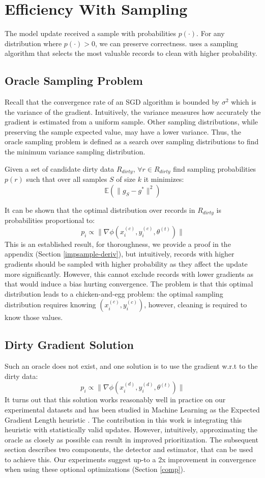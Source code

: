 \section{Efficiency With Sampling}\label{dist-samp}
The model update received a sample with probabilities $p(\cdot)$.
For any distribution where  $p(\cdot) > 0$, we can preserve correctness.
\sys uses a sampling algorithm that selects the most valuable records to clean with higher probability. 

\subsection{Oracle Sampling Problem}
Recall that the convergence rate of an SGD algorithm is bounded by $\sigma^2$ which is the variance of the gradient.
Intuitively, the variance measures how accurately the gradient is estimated from a uniform sample.
Other sampling distributions, while preserving the sample expected value, may have a lower variance.
Thus, the oracle sampling problem is defined as a search over sampling distributions to find the minimum variance sampling distribution.

\begin{definition}
Given a set of candidate dirty data $R_{dirty}$, $\forall r \in R_{dirty}$ find sampling probabilities $p(r)$ such that over all samples $S$ of size $k$ it minimizes:
\[
\mathbb{E}(\|g_S - g^*\|^2)
\]
\end{definition}
It can be shown that the optimal distribution over records in $R_{dirty}$ is probabilities proportional to:
\[
p_i \propto \|\nabla\phi(x^{(c)}_i,y^{(c)}_i,\theta^{(t)})\|
\]
This is an established result, for thoroughness, we provide a proof in the appendix (Section \ref{impsample-deriv}), but intuitively, records with higher gradients should be sampled with higher probability as they affect the update more significantly.
However, this cannot exclude records with lower gradients as that would induce a bias hurting convergence.
The problem is that this optimal distribution leads to a chicken-and-egg problem:
the optimal sampling distribution requires knowing $(x^{(c)}_i,y^{(c)}_i)$, however, cleaning is required to know those values.

\subsection{Dirty Gradient Solution}\label{dgsample}
Such an oracle does not exist, and one solution is to use the gradient w.r.t to the dirty data:
\[
p_i \propto \|\nabla\phi(x^{(d)}_i,y^{(d)}_i,\theta^{(t)})\|
\]
It turns out that this solution works reasonably well in practice on our experimental datasets and has been studied in Machine Learning as the Expected Gradient Length heuristic \cite{settles2010active}.
The contribution in this work is integrating this heuristic with statistically valid updates.
However, intuitively, approximating the oracle as closely as possible can result in improved prioritization.
The subsequent section describes two components, the detector and estimator, that can be used to achieve this.
Our experiments suggest up-to a 2x improvement in convergence when using these optional optimizations (Section \ref{comp}).